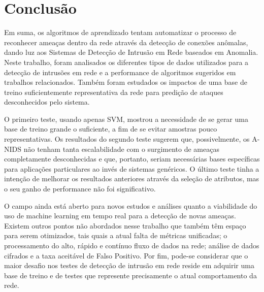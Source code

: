 \chapter{Conclusão}
\label{ch:conclusao}

Em suma, os algoritmos de aprendizado tentam automatizar o processo de reconhecer ameaças dentro da rede
através da detecção de conexões anômalas, dando luz aos Sistemas de Detecção de Intrusão em Rede baseados em Anomalia.
Neste trabalho, foram analisados os diferentes tipos de dados utilizados para a detecção de intrusões em rede e a
performance de algoritmos sugeridos em trabalhos relacionados. Também foram estudados os impactos de uma base de
treino suficientemente representativa da rede para predição de ataques desconhecidos pelo sistema.
\par O primeiro teste, usando apenas SVM, mostrou a necessidade de se gerar uma base de treino grande o suficiente, a
fim de se evitar amostras pouco representativas. Os resultados do segundo teste sugerem que, possivelmente, os A-NIDS
não tenham tanta escalabilidade com o surgimento de ameaças completamente desconhecidas e que, portanto, seriam
necessárias bases específicas para aplicações particulares ao invés de sistemas genéricos. O último teste tinha a
intenção de melhorar os resultados anteriores através da seleção de atributos, mas o seu ganho de performance não foi
significativo.
\par O campo ainda está aberto para novos estudos e análises quanto a viabilidade do uso de machine learning em tempo
real para a detecção de novas ameaças. Existem outros pontos não abordados nesse trabalho que também têm espaço para
serem otimizados, tais quais a atual falta de métricas unificadas; o processamento do alto, rápido e contínuo fluxo de
dados na rede; análise de dados cifrados e a taxa aceitável de Falso Positivo. Por fim, pode-se considerar que
 o maior desafio nos testes de detecção de intrusão em rede reside em adquirir uma base de treino e de testes que
 represente precisamente o atual comportamento da rede.